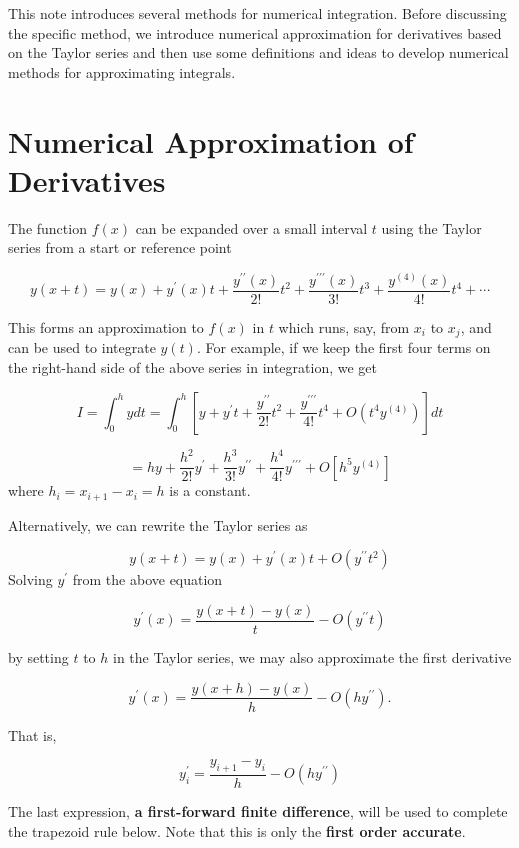 \documentclass[
]{book}
\begin{document}
This note introduces several methods for numerical integration. Before discussing the specific method, we introduce numerical approximation for derivatives based on the Taylor series and then use some definitions and ideas to develop numerical methods for approximating integrals.

\hfill\break

\hypertarget{numerical-approximation-of-derivatives}{%
\section{Numerical Approximation of Derivatives}\label{numerical-approximation-of-derivatives}}

\hfill\break

The function \(f(x)\) can be expanded over a small interval \(t\) using the Taylor series from a start or reference point

\[
y(x+t)=y(x) + y^\prime(x)t + \frac{y^{\prime\prime} (x)}{2!} t^2  + \frac{y^{\prime\prime\prime} (x)}{3!} t^3 +\frac{y^{(4)} (x)}{4!} t^4  + \cdots
\]

This forms an approximation to \(f(x)\) in \(t\) which runs, say, from \(x_i\) to \(x_j\), and can be used to integrate \(y(t)\). For example, if we keep the first four terms on the right-hand side of the above series in integration, we get

\[
I = \int_0^h ydt = \int_0^h \left[y + y^\prime t + \frac{y^{\prime\prime}}{2!}t^2 + \frac{y^{\prime\prime\prime}}{4!}t^4 + O(t^4 y^{(4)}) \right]dt
\]

\[
 = hy + \frac{h^2}{2!}y^{\prime} + \frac{h^3}{3!}y^{\prime\prime} + \frac{h^4}{4!}y^{\prime\prime\prime} + O[h^5y^{(4)}]
\]
where \(h_i = x_{i+1} - x_i = h\) is a constant.

Alternatively, we can rewrite the Taylor series as

\[
y(x+t)=y(x) + y^\prime(x)t + O(y^{\prime\prime} t^2) 
\]
Solving \(y^\prime\) from the above equation

\[
y^\prime(x) = \frac{y(x+t) - y(x)}{t} - O(y^{\prime\prime}t) 
\]

by setting \(t\) to \(h\) in the Taylor series, we may also approximate the first derivative

\[
y^\prime (x) = \frac{y(x+h) - y(x)}{h} - O(hy^{\prime\prime}).
\]

That is,

\[
y_i^\prime= \frac{y_{i+1}-y_i}{h} - O(hy^{\prime\prime})
\]

The last expression, \textbf{a first-forward finite difference}, will be used to complete the trapezoid rule below. Note that this is only the \textbf{first order accurate}.
\end{document}

